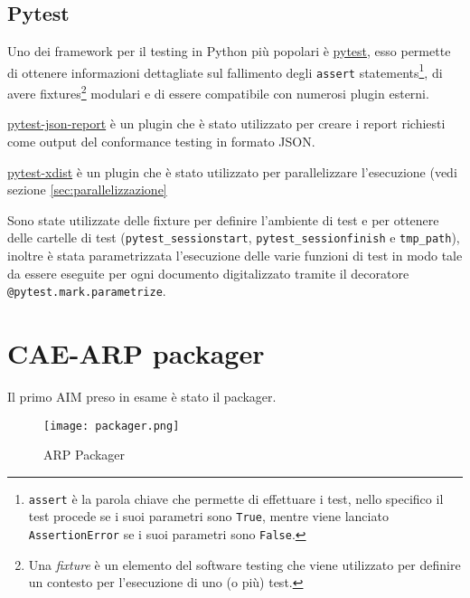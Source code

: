 \subsection{Pytest} \label{ssec:pytest} %
Uno dei framework per il testing in Python più popolari è \href{https://pytest.org}{pytest}, esso permette di ottenere informazioni dettagliate sul fallimento degli \texttt{assert} statements\footnote{\texttt{assert} è la parola chiave che permette di effettuare i test, nello specifico il test procede se i suoi parametri sono \texttt{True}, mentre viene lanciato \texttt{AssertionError} se i suoi parametri sono \texttt{False}.}, di avere fixtures\footnote{Una \textit{fixture} è un elemento del software testing che viene utilizzato per definire un contesto per l'esecuzione di uno (o più) test.} modulari e di essere compatibile con numerosi plugin esterni.

\href{https://github.com/numirias/pytest-json-report}{pytest-json-report} è un plugin che è stato utilizzato per creare i report richiesti come output del conformance testing in formato JSON.

\href{https://pytest-xdist.readthedocs.io/}{pytest-xdist} è un plugin che è stato utilizzato per parallelizzare l'esecuzione (vedi sezione \ref{sec:parallelizzazione}

Sono state utilizzate delle fixture per definire l'ambiente di test e per ottenere delle cartelle di test (\verb|pytest_sessionstart|, \verb|pytest_sessionfinish| e \verb|tmp_path|), inoltre è stata parametrizzata l'esecuzione delle varie funzioni di test in modo tale da essere eseguite per ogni documento digitalizzato tramite il decoratore \texttt{@pytest.mark.parametrize}.


\section{\acs{CAE}-\acs{ARP} packager} \label{sec:test-packager}
Il primo \ac{AIM} preso in esame è stato il packager.

\begin{figure}[h]
    \centering
    \texttt{[image: packager.png]}
    \caption{\ac{ARP} Packager}
    \label{fig:packager}
\end{figure}

